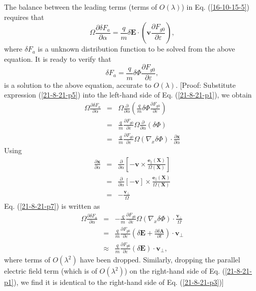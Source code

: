 \documentclass{llncs}
\newcommand{\tmmathbf}[1]{\ensuremath{\boldsymbol{#1}}}
\begin{document}
The balance between the leading terms (terms of $O (\lambda)$) in Eq.
(\ref{16-10-15-5}) requires that
\begin{equation}
  \label{21-8-21-p1} \Omega \frac{\partial \delta F_a}{\partial \alpha} =
  \frac{q}{m} \delta \mathbf{E} \cdot \left( \mathbf{v} \frac{\partial F_{g
  0}}{\partial \varepsilon} \right),
\end{equation}
where $\delta F_a$ is a unknown distribution function to be solved from the
above equation. It is ready to verify that
\begin{equation}
  \label{21-8-21-p5} \delta F_a = \frac{q}{m} \delta \Phi \frac{\partial F_{g
  0}}{\partial \varepsilon},
\end{equation}
is a solution to the above equation, accurate to $O (\lambda)$. [Proof:
Substitute expression (\ref{21-8-21-p5}) into the left-hand side of Eq.
(\ref{21-8-21-p1}), we obtain
\begin{eqnarray}
  \Omega \frac{\partial \delta F_a}{\partial \alpha} & = & \Omega
  \frac{\partial}{\partial \alpha} \left( \frac{q}{m} \delta \Phi
  \frac{\partial F_{g 0}}{\partial \varepsilon} \right) \nonumber\\
  & = & \frac{q}{m} \frac{\partial F_{g 0}}{\partial \varepsilon} \Omega
  \frac{\partial}{\partial \alpha} (\delta \Phi) \nonumber\\
  & = & \frac{q}{m} \frac{\partial F_{g 0}}{\partial \varepsilon} \Omega
  (\nabla_x \delta \Phi) \cdot \frac{\partial \mathbf{x}}{\partial \alpha} 
  \label{21-8-21-p7}
\end{eqnarray}
Using
\begin{eqnarray}
  \frac{\partial \mathbf{x}}{\partial \alpha} & = & \frac{\partial
  \textbf{}}{\partial \alpha} \left[ -\mathbf{v} \times
  \frac{\tmmathbf{e}_{\parallel} (\mathbf{X})}{\Omega (\mathbf{X})} \right]
  \nonumber\\
  & = & \frac{\partial \textbf{}}{\partial \alpha} [-\mathbf{v}] \times
  \frac{\tmmathbf{e}_{\parallel} (\mathbf{X})}{\Omega (\mathbf{X})}
  \nonumber\\
  & = & - \frac{\mathbf{v}_{\perp}}{\Omega} 
\end{eqnarray}
Eq. (\ref{21-8-21-p7}) is written as
\begin{eqnarray}
  \Omega \frac{\partial \delta F_a}{\partial \alpha} & = & - \frac{q}{m}
  \frac{\partial F_{g 0}}{\partial \varepsilon} \Omega (\nabla_x \delta \Phi)
  \cdot \frac{\mathbf{v}_{\perp}}{\Omega} \nonumber\\
  & = & \frac{q}{m} \frac{\partial F_{g 0}}{\partial \varepsilon} \left(
  \delta \mathbf{E}+ \frac{\partial \delta \mathbf{A}}{\partial t} \right)
  \cdot \mathbf{v}_{\perp} \\
  & \approx & \frac{q}{m} \frac{\partial F_{g 0}}{\partial \varepsilon}
  (\delta \mathbf{E}) \cdot \mathbf{v}_{\perp},  \label{21-8-21-p3}
\end{eqnarray}
where terms of $O (\lambda^2)$ have been dropped. Similarly, dropping the
parallel electric field term (which is of $O (\lambda^2)$) on the right-hand
side of Eq. (\ref{21-8-21-p1}), we find it is identical to the right-hand side
of Eq. (\ref{21-8-21-p3})]
\end{document}
